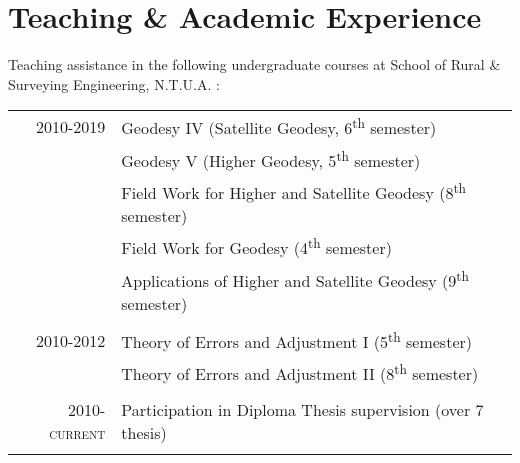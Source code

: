 \documentclass[9pt]{extarticle} %
\begin{document}
\section{Teaching \& Academic Experience}
%
Teaching assistance in the following undergraduate courses at School of Rural \& Surveying Engineering, N.T.U.A. :
%
\begin{longtable}{rl}
%
\textsc{2010-2019} & 
    Geodesy IV (Satellite Geodesy, 6\textsuperscript{th} semester)\\
  & Geodesy V (Higher Geodesy, 5\textsuperscript{th} semester)\\
  & Field Work for Higher and Satellite Geodesy (8\textsuperscript{th} semester)\\
  & Field Work for Geodesy (4\textsuperscript{th} semester)\\
  & Applications of Higher and Satellite Geodesy (9\textsuperscript{th} semester)\\
&\\
%
\textsc{2010-2012} & 
  Theory of Errors and Adjustment I (5\textsuperscript{th} semester)\\
  & Theory of Errors and Adjustment II (8\textsuperscript{th} semester)\\
&\\
%
\textsc{2010-current} & 
  Participation in Diploma Thesis supervision (over 7 thesis)\\
&\\
%
\end{longtable}
\medskip

\end{document}
